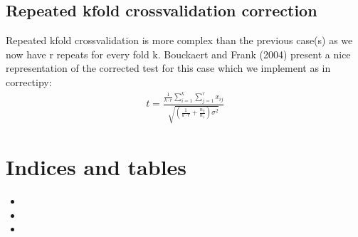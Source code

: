 \documentclass[letterpaper,10pt,english]{sphinxmanual}
\begin{document}
\section{Repeated k\sphinxhyphen{}fold cross\sphinxhyphen{}validation correction}
\label{\detokenize{statistic_info:repeated-k-fold-cross-validation-correction}}
Repeated k\sphinxhyphen{}fold cross\sphinxhyphen{}validation is more complex than the previous case(s) as we now have r repeats for every fold k. Bouckaert and Frank (2004) present a nice representation of the corrected test for this case which we implement as  in correctipy:
\begin{equation*}
\begin{split}t = \frac{\frac{1}{k \cdot r} \sum_{i=1}^{k} \sum_{j=1}^{r} x_{ij}}{\sqrt{(\frac{1}{k \cdot r} + \frac{n_{2}}{n_{1}})\sigma^{2}}}\end{split}
\end{equation*}

\chapter{Indices and tables}
\label{\detokenize{index:indices-and-tables}}\begin{itemize}
\item {} 

\item {} 

\item {} 

\end{itemize}



\renewcommand{\indexname}{Index}
\printindex
\end{document}
